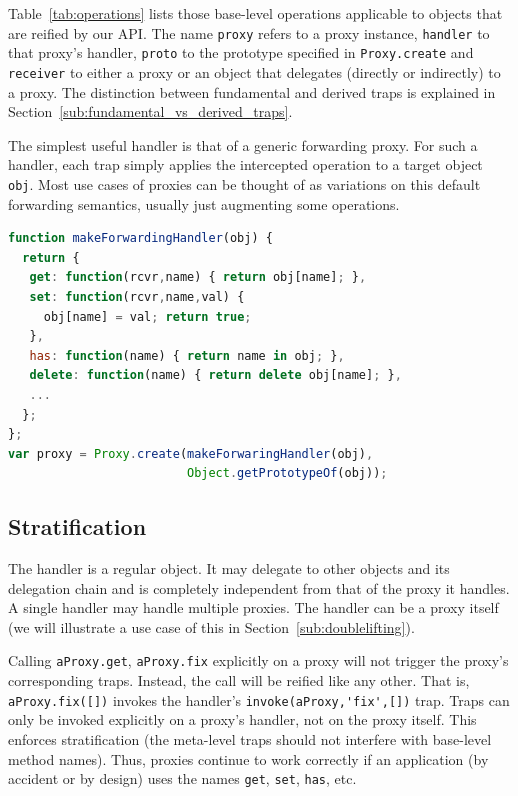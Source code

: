 \documentclass{acm_proc_article-sp}
\begin{document}
Table~\ref{tab:operations} lists those base-level operations applicable to objects that are reified by our API. The name \texttt{proxy} refers to a proxy instance, \texttt{handler} to that proxy's handler, \texttt{proto} to the prototype specified in \texttt{Proxy.create} and \texttt{receiver} to either a proxy or an object that delegates (directly or indirectly) to a proxy. The distinction between fundamental and derived traps is explained in Section~\ref{sub:fundamental_vs_derived_traps}.

The simplest useful handler is that of a generic forwarding proxy. For such a handler, each trap simply applies the intercepted operation to a target object \texttt{obj}. Most use cases of proxies can be thought of as variations on this default forwarding semantics, usually just augmenting some operations.

\begin{lstlisting}[language=javascript]
function makeForwardingHandler(obj) {
  return {
   get: function(rcvr,name) { return obj[name]; },
   set: function(rcvr,name,val) {
     obj[name] = val; return true;
   },
   has: function(name) { return name in obj; },
   delete: function(name) { return delete obj[name]; },
   ...
  };
};
var proxy = Proxy.create(makeForwaringHandler(obj),
                         Object.getPrototypeOf(obj));
\end{lstlisting}

\subsection{Stratification}

The handler is a regular object. It may delegate to other objects and its delegation chain and is completely independent from that of the proxy it handles. A single handler may handle multiple proxies. The handler can be a proxy itself (we will illustrate a use case of this in Section~\ref{sub:doublelifting}).

Calling \lstinline{aProxy.get}, \lstinline{aProxy.fix} explicitly on a proxy will not trigger the proxy's corresponding traps. Instead, the call will be reified like any other. That is, \lstinline{aProxy.fix([])} invokes the handler's \lstinline{invoke(aProxy,'fix',[])} trap. Traps can only be invoked explicitly on a proxy's handler, not on the proxy itself. This enforces stratification (the meta-level traps should not interfere with base-level method names). Thus, proxies continue to work correctly if an application (by accident or by design) uses the names \texttt{get}, \texttt{set}, \texttt{has}, etc.
\end{document}
